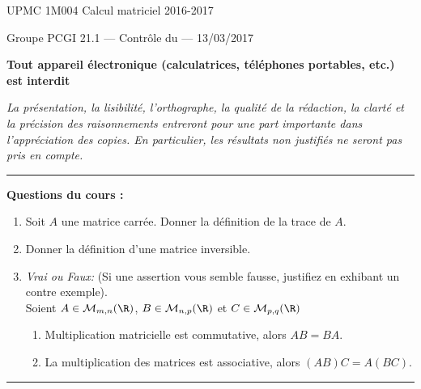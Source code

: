 \documentclass[11pt]{article}
\begin{document}
{\large UPMC \hfill 1M004 Calcul matriciel \hfill 2016-2017}

\vskip -3mm
\noindent \textbf{\hrulefill}

\vskip 1mm

\centerline{
{\large Groupe PCGI 21.1 \hspace{1.7 cm} --- Contrôle du --- \hspace{3.5 cm}  13/03/2017}}


\vskip -2mm
\noindent \textbf{\hrulefill}



\vskip 2mm

\centerline{\textbf{Tout appareil \'electronique (calculatrices, t\'el\'ephones portables, etc.) est interdit}}

\vskip 2mm



{\sl  La pr\'esentation, la lisibilit\'e, l'orthographe, la
 qualit\'e de la r\'edaction, la clart\'e et la pr\'ecision des
 raisonnements entreront pour une part importante dans
 l'appr\'eciation des copies. En particulier, les r\'esultats non
 justifi\'es ne seront pas pris en compte. }


\vskip 3mm
\hrule

\vskip 3mm

\textbf{Questions du cours :} 
\begin{enumerate}
\item  Soit $A$ une matrice carrée. Donner la définition de la trace de $A$.
\item Donner la définition d'une matrice inversible.
\item  \emph{Vrai ou Faux:} (Si une assertion vous semble fausse, justifiez en exhibant un contre exemple).\\
 Soient $A \in \mathcal{M}_{m,n}(\R)$, $B \in \mathcal{M}_{n,p}(\R)$ et $C \in \mathcal{M}_{p,q}(\R)$
\begin{enumerate}
\item Multiplication matricielle est commutative, alors $AB = BA$.
\item La multiplication des matrices est associative, alors $(AB)C = A(BC)$.
\end{enumerate}
       
\end{enumerate}
\vskip 0.2cm
  \hrule
\vskip 2mm
\end{document}
